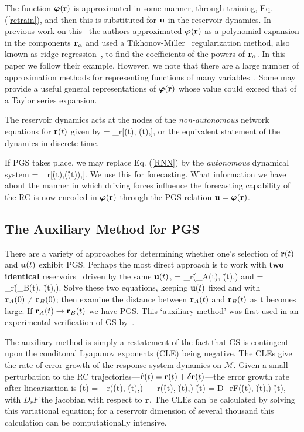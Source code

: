 \documentclass[12pt]{article}
\begin{document}
The function $\mbox{$\boldsymbol{\varphi}$}(\mbox{{\bf r}})$ is approximated in some manner,  through training, Eq. (\ref{rctrain}), and then this is substituted for $\mbox{$\bf{u}$}$ in the reservoir dynamics. In previous work on this~\cite{hunt19,ottdresden19} the authors approximated $\mbox{$\boldsymbol{\varphi}$}(\mbox{{\bf r}})$ as a polynomial expansion in the components $\mbox{{\bf r}}_{\alpha}$ and used a Tikhonov-Miller~\cite{miller70,tikhonov77, Press-Flannery-2007-NumRecipes} regularization method, also known as ridge regression~\cite{khalaf05}, to find the coefficients of the powers of $\mbox{{\bf r}}_{\alpha}$. In this paper we follow their example. However, we note that there are a large number of approximation methods for representing functions of many variables~\cite{silverman86,p-rbfmir-87,buhmann09,casdagli89,billings13,broom88,Scott05,guill98}. Some may provide a useful general representations of $\mbox{$\boldsymbol{\varphi}$}(\mbox{{\bf r}})$ whose value could exceed that of a Taylor series expansion.

The reservoir dynamics acts at the nodes of the {\it non-autonomous} network equations for $\mbox{{\bf r}}(t)$ given by
\be
{} = \F_r[\r(t), \u(t),\btheta],
\label{RNN}
\ee
or the equivalent statement of the dynamics in discrete time.

If PGS takes place, we may replace Eq. (\ref{RNN}) by the {\it autonomous} dynamical system
\be
{} = \F_r[\r(t),\bvarphi(\r(t)),\btheta].
\ee
We use this for forecasting. What information we have about the manner in which driving forces influence the forecasting capability of the RC is now encoded in $\mbox{$\boldsymbol{\varphi}$}(\mbox{{\bf r}})$ through the PGS relation $\mbox{$\bf{u}$} = \mbox{$\boldsymbol{\varphi}$}(\mbox{{\bf r}})$.

\subsection{The Auxiliary Method for PGS}
There are a variety of approaches for determining whether one's selection of $\mbox{{\bf r}}(t)$ and $\mbox{$\bf{u}$}(t)$ exhibit PGS. Perhaps the most direct approach is to work with {\bf two identical} reservoirs~\cite{abar96,ars96} driven by the same $\mbox{$\bf{u}$}(t)$, 
\be
{} = \F_r(\r_A(t), \u(t),\btheta) \; \mbox{and} \;  = \F_r(\r_B(t), \u(t),\btheta).
\ee
Solve these two equations, keeping $\mbox{$\bf{u}$}(t)$ fixed and with $\mbox{{\bf r}}_A(0) \ne \mbox{{\bf r}}_B(0)$; then examine the distance between $\mbox{{\bf r}}_A(t)$ and $\mbox{{\bf r}}_B(t)$ as t becomes large. If $\mbox{{\bf r}}_A(t) \to \mbox{{\bf r}}_B(t)$ we have PGS.  This `auxiliary method' was first used in an experimental verification of GS by~\cite{tang98}.

The auxiliary method is simply a restatement of the fact that GS is contingent upon the conditonal Lyapunov exponents (CLE) being negative.  The CLEs give the rate of error growth of the response system dynamics on $\mathcal{M}$.  Given a small perturbation to the RC trajectories---$\hat {\mbox{{\bf r}}}(t) = \mbox{{\bf r}}(t) + \delta \mbox{{\bf r}}(t)$---the error growth rate after linearization is
\be
{} \delta \r(t) = \F_r(\r(t), \u(t),\btheta) - \F_r(\hat \r(t), \u(t),\btheta) \Rightarrow {} \delta \r(t) = D_rF(\r(t), \u(t),\btheta) \cdot \delta \r(t),
\ee
with $D_rF$ the jacobian with respect to $\mbox{{\bf r}}$.  The CLEs can be calculated by solving this variational equation; for a reservoir dimension of several thousand this calculation can be computationally intensive.
\end{document}
